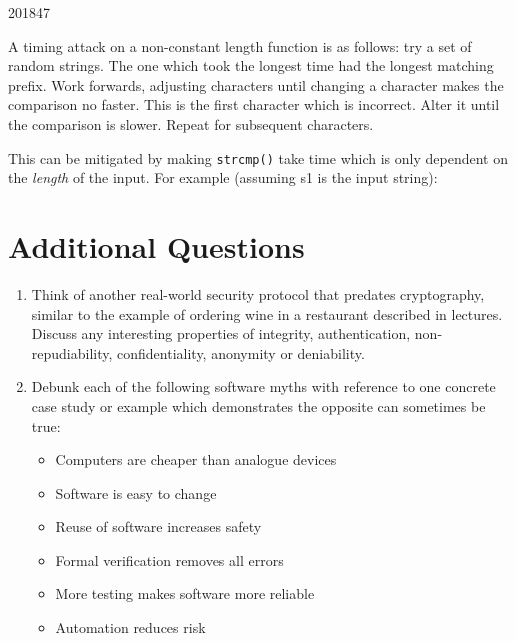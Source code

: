 \documentclass[10pt,\jkfside,a4paper]{article}
\begin{document}
\begin{examquestion}{2018}{4}{7}
\begin{enumerate}
A timing attack on a non-constant length function is as follows: try a set of
random strings. The one which took the longest time had the longest
matching prefix. Work forwards, adjusting characters until changing a
character makes the comparison no faster. This is the first character which
is incorrect. Alter it until the comparison is slower. Repeat for
subsequent characters.

This can be mitigated by making \texttt{strcmp()} take time which is only
dependent on the \textit{length} of the input. For example (assuming s1 is
the input string):

\end{enumerate}

\end{examquestion}

\part{Additional Questions}

\begin{enumerate}

\item Think of another real-world security protocol that predates
cryptography, similar to the example of ordering wine in a restaurant
described in lectures. Discuss any interesting properties of integrity,
authentication, non-repudiability, confidentiality, anonymity or deniability.


\item Debunk each of the following software myths with reference to one
concrete case study or example which demonstrates the opposite can
sometimes be true:

\begin{itemize}

\item Computers are cheaper than analogue devices


\item Software is easy to change


\item Reuse of software increases safety


\item Formal verification removes all errors


\item More testing makes software more reliable


\item Automation reduces risk


\end{itemize}



\end{enumerate}
\end{document}
